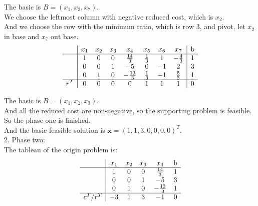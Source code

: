 \documentclass[10pt]{article}
\renewcommand{\mathbf}{\boldsymbol}
\begin{document}
The basic is $B=(x_1,x_3,x_7)$.\\
We choose the leftmost column with negative reduced cost, which is $x_2$.\\
And we choose the row with the minimum ratio, which is row 3, and pivot, let $x_2$ in base and $x_7$ out base.\\

\begin{equation}
	\begin{aligned}
		\begin{array}{c|ccccccc|c}
			& x_1 & x_2 & x_3 & x_4 & x_5 & x_6 & x_7 & \text{b} \\
			\hline
			& 1 & 0 & 0 & \frac{14}{3} & \frac{1}{3} & 1 & -\frac{4}{3} & 1 \\
			& 0 & 0 & 1 & -5 & 0 & -1 & 2 & 3 \\
			& 0 & 1 & 0 & -\frac{13}{3} & \frac{1}{3} & -1 & \frac{5}{3} & 1 \\
			\hline
			r^T & 0 & 0 & 0 & 0 & 1 & 1 & 1 & 0 \\
		\end{array}
	\end{aligned}
\end{equation}

The basic is $B=(x_1,x_2,x_3)$.\\
And all the reduced cost are non-negative, so the supporting problem is feasible.\\
So the phase one is finished.\\
And the basic feasible solution is $\mathbf{x}=(1,1,3,0,0,0,0)^T$.\\

2. Phase two:\\
The tableau of the origin problem is:\\
\begin{equation}
	\begin{aligned}
		\begin{array}{c|ccccccc|c}
			& x_1 & x_2 & x_3 & x_4 & \text{b} \\
			\hline
			& 1 & 0 & 0 & \frac{14}{3} & 1 \\
			& 0 & 0 & 1 & -5 & 3 \\
			& 0 & 1 & 0 & -\frac{13}{3} & 1 \\
			\hline
			c^T/r^T & -3 & 1 & 3 & -1 & 0 \\
		\end{array}
	\end{aligned}
\end{equation}
\end{document}
